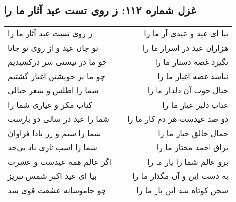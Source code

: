 \begin{center}
\section*{غزل شماره ۱۱۲: ز روی تست عید آثار ما را}
\label{sec:0112}
\begin{longtable}{l p{0.5cm} r}
ز روی تست عید آثار ما را
&&
بیا ای عید و عیدی آر ما را
\\
تو جان عید و از روی تو جانا
&&
هزاران عید در اسرار ما را
\\
چو ما در نیستی سر درکشیدیم
&&
نگیرد غصه دستار ما را
\\
چو ما بر خویشتن اغیار گشتیم
&&
نباشد غصه اغیار ما را
\\
شما را اطلس و شعر خیالی
&&
خیال خوب آن دلدار ما را
\\
کتاب مکر و عیاری شما را
&&
عتاب دلبر عیار ما را
\\
شما را عید در سالی دو بارست
&&
دو صد عیدست هر دم کار ما را
\\
شما را سیم و زر بادا فراوان
&&
جمال خالق جبار ما را
\\
شما را اسب تازی باد بی‌حد
&&
براق احمد مختار ما را
\\
اگر عالم همه عیدست و عشرت
&&
برو عالم شما را یار ما را
\\
بیا ای عید اکبر شمس تبریز
&&
به دست این و آن مگذار ما را
\\
چو خاموشانه عشقت قوی شد
&&
سخن کوتاه شد این بار ما را
\\
\end{longtable}
\end{center}
